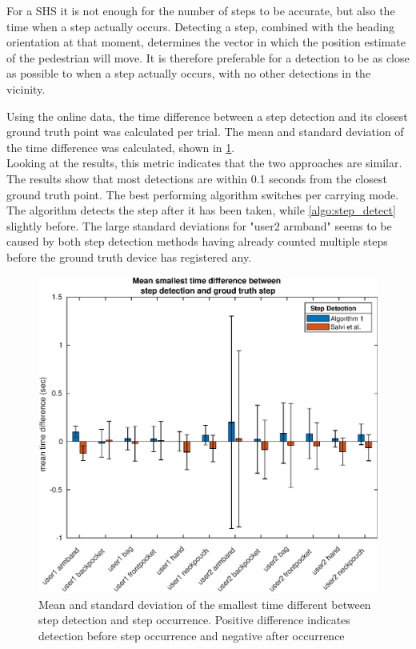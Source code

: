 For a \ac{SHS} it is not enough for the number of steps to be accurate, but also the time when a step actually occurs. Detecting a step, combined with the heading orientation at that moment, determines the vector in which the position estimate of the pedestrian will move. It is therefore preferable for a detection to be as close as possible to when a step actually occurs, with no other detections in the vicinity. \par
Using the online data, the time difference between a step detection and its closest ground truth point was calculated per trial. The mean and standard deviation of the time difference was calculated, shown in \cref{fig:202011130914smallest_diff_to_gt_1}.\\ Looking at the results, this metric indicates that the two approaches are similar. The results show that most detections are within 0.1 seconds from the closest ground truth point. The best performing algorithm switches per carrying mode. The \citet{Salvi2018} algorithm detects the step after it has been taken, while \cref{algo:step_detect} slightly before. The large standard deviations for "user2 armband" seems to be caused by both step detection methods having already counted multiple steps before the ground truth device has registered any.

\begin{figure}[H]
	\centering
	\includegraphics[width=0.7\linewidth]{images/20201113_0914_smallest_diff_to_gt_1}
	\caption{Mean and standard deviation of the smallest time different between step detection and step occurrence. Positive difference indicates detection before step occurrence and negative after occurrence}
	\label{fig:202011130914smallest_diff_to_gt_1}
\end{figure}

